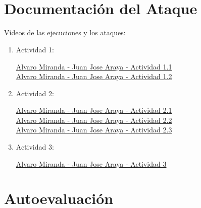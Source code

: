 \documentclass{article}
\begin{document}
\\
\\



\section*{Documentación del Ataque}

Vídeos de las ejecuciones y los ataques: \\

\begin{enumerate}
  \item Actividad 1:

  \href{https://www.loom.com/share/622ec72dc2cb4c658d06e8dee2589afd}{Alvaro Miranda - Juan Jose Araya - Actividad 1.1} \\
  
  \href{https://www.loom.com/share/7ac21ee2b903425195a60f802dd6a9c9}{Alvaro Miranda - Juan Jose Araya - Actividad 1.2} \\
  
  \item Actividad 2:
  
  \href{https://www.loom.com/share/36b82066d6d043168116ed0fc0b293b6}{Alvaro Miranda - Juan Jose Araya - Actividad 2.1} \\
  
  \href{https://www.loom.com/share/6dc3ff3fbb97469085bb2e26dcbf3220}{Alvaro Miranda - Juan Jose Araya - Actividad 2.2} \\
  
  \href{https://www.loom.com/share/466ba0ef96464f9a95a7eb8b19e8fb2f}{Alvaro Miranda - Juan Jose Araya - Actividad 2.3} \\
  
  \item Actividad 3:
  
  \href{https://www.loom.com/share/ae3e916e6bf14555b860367652aa316d}{Alvaro Miranda - Juan Jose Araya - Actividad 3} \\
  
\end{enumerate}



\section*{Autoevaluación}
\end{document}
